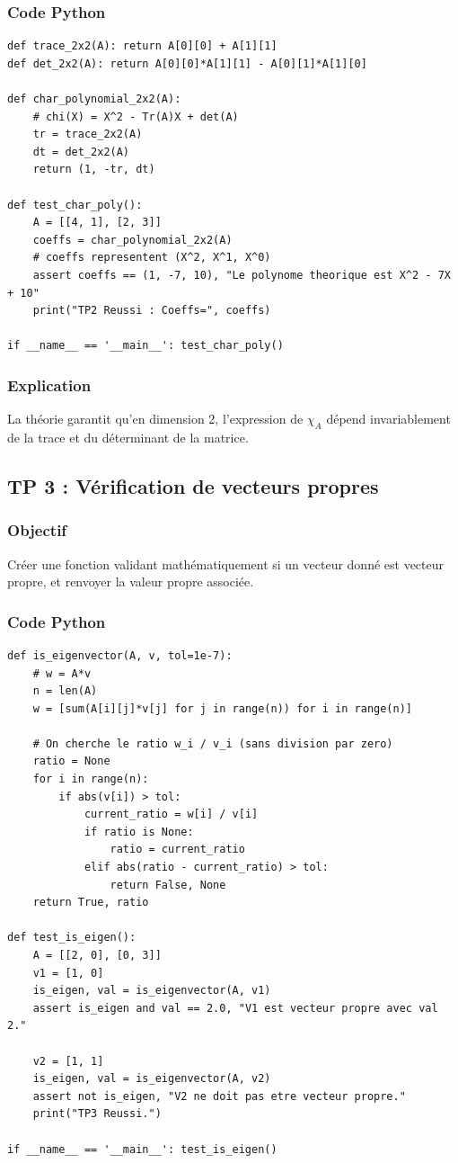 \documentclass[11pt,a4paper]{article}
\begin{document}
\subsubsection*{Code Python}
\begin{lstlisting}
def trace_2x2(A): return A[0][0] + A[1][1]
def det_2x2(A): return A[0][0]*A[1][1] - A[0][1]*A[1][0]

def char_polynomial_2x2(A):
    # chi(X) = X^2 - Tr(A)X + det(A)
    tr = trace_2x2(A)
    dt = det_2x2(A)
    return (1, -tr, dt)

def test_char_poly():
    A = [[4, 1], [2, 3]]
    coeffs = char_polynomial_2x2(A)
    # coeffs representent (X^2, X^1, X^0)
    assert coeffs == (1, -7, 10), "Le polynome theorique est X^2 - 7X + 10"
    print("TP2 Reussi : Coeffs=", coeffs)

if __name__ == '__main__': test_char_poly()
\end{lstlisting}
\subsubsection*{Explication}
La théorie garantit qu'en dimension 2, l'expression de $\chi_A$ dépend invariablement de la trace et du déterminant de la matrice.


\subsection*{TP 3 : Vérification de vecteurs propres}

\subsubsection*{Objectif}
Créer une fonction validant mathématiquement si un vecteur donné est vecteur propre, et renvoyer la valeur propre associée.

\subsubsection*{Code Python}
\begin{lstlisting}
def is_eigenvector(A, v, tol=1e-7):
    # w = A*v
    n = len(A)
    w = [sum(A[i][j]*v[j] for j in range(n)) for i in range(n)]

    # On cherche le ratio w_i / v_i (sans division par zero)
    ratio = None
    for i in range(n):
        if abs(v[i]) > tol:
            current_ratio = w[i] / v[i]
            if ratio is None:
                ratio = current_ratio
            elif abs(ratio - current_ratio) > tol:
                return False, None
    return True, ratio

def test_is_eigen():
    A = [[2, 0], [0, 3]]
    v1 = [1, 0]
    is_eigen, val = is_eigenvector(A, v1)
    assert is_eigen and val == 2.0, "V1 est vecteur propre avec val 2."

    v2 = [1, 1]
    is_eigen, val = is_eigenvector(A, v2)
    assert not is_eigen, "V2 ne doit pas etre vecteur propre."
    print("TP3 Reussi.")

if __name__ == '__main__': test_is_eigen()
\end{lstlisting}
\end{document}
